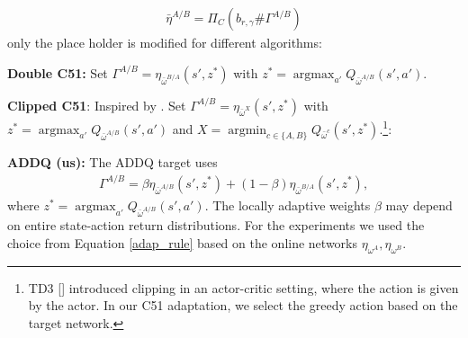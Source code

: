 \documentclass{article}
\theoremstyle{plain}
\theoremstyle{definition}
\theoremstyle{remark}
\begin{document}
\begin{align*}
    \bar\eta^{A/B}=\Pi_C(b_{r,\gamma}\# \Gamma^{A/B})
\end{align*}
only the place holder is modified for different algorithms:

\textbf{Double C51:} Set $\Gamma^{A/B} = \eta_{\bar\omega^{B/A}}(s',z^*)$ with  $z^*=\operatorname{argmax}_{a'}Q_{\bar\omega^{A/B}}(s',a')$. 


   \textbf{Clipped C51}: Inspired by \cite{fujimoto2018addressing}. Set $\Gamma^{A/B}=\eta_{\bar\omega^X}(s',z^*)$ with    $z^*=\operatorname{argmax}_{a'}Q_{\bar\omega^{A/B}}(s',a')$ and $X=\operatorname{argmin}_{c\in\{A,B\}}Q_{\bar\omega^c}(s',z^*)$.\footnote{TD3 [\cite{fujimoto2018addressing}] introduced clipping in an actor-critic setting, where the action is given by the actor. In our C51 adaptation, we select the greedy action based on the target network.}:  

    \textbf{ADDQ (us):} The ADDQ target uses
    \begin{align*}      
    \Gamma^{A/B}=\beta\eta_{\bar\omega^{A/B}}(s',z^*)+(1-\beta)\eta_{\bar\omega^{B/A}}(s',z^*),
    \end{align*}
    where $z^*=\operatorname{argmax}_{a'}Q_{\bar\omega^{A/B}}(s',a').$ The locally adaptive weights $\beta$ may depend on entire state-action return distributions. For the experiments we used the choice from Equation \eqref{adap_rule} based on the online networks $\eta_{\omega^A}, \eta_{\omega^B}$.
\end{document}

